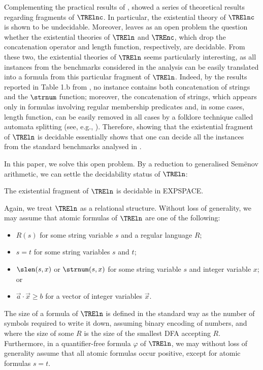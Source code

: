 Complementing the practical results of \cite{BKMMDNG20}, \cite{BDGKMMN23} showed a series of theoretical results regarding fragments of $\TRElnc$. In particular, the existential theory of $\TRElnc$ is shown to be undecidable. Moreover, \cite{BDGKMMN23} leaves as an open problem the question whether the existential theories of $\TREln$ and $\TREnc$, which drop the concatenation operator and length function, respectively, are decidable. From these two, the existential theories of $\TREln$ seems particularly interesting, as all instances from the benchmarks considered in the analysis \cite{BDGKMMN23} can be easily translated into a formula from this particular fragment of $\TREln$. Indeed, by the results reported in Table 1.b from \cite{BDGKMMN23},  %
no instance contains both concatenation of strings and the $\strnum$ function; moreover, the concatenation of strings, which appears only in formulas involving regular membership predicates and, in some cases, length function, can be easily removed in all cases by a folklore technique called automata splitting (see, e.g., \cite{AACHRRS15}). Therefore, showing that the existential fragment of $\TREln$ is decidable essentially shows that one can decide all the instances from the standard benchmarks analysed in \cite{BDGKMMN23}.

In this paper, we solve this open problem. By a reduction to generalised Sem{\"e}nov arithmetic, we can settle the decidability status of $\TREln$:
%
\begin{theorem}
  The existential fragment of $\TREln$ is decidable in EXPSPACE.
\end{theorem}
%

Again, we treat $\TREln$ as a relational structure. Without loss of
generality, we may assume that atomic formulas of $\TREln$ are one of
the following:
%
\begin{itemize}
\item $R(s)$ for some string variable $s$ and a regular language $R$;
\item $s=t$ for some string variables $s$ and $t$;
\item $\slen(s,x)$ or $\strnum(s,x)$ for some string variable $s$ and
  integer variable $x$; or
\item $\vec a \cdot \vec x \ge b$ for a vector of integer variables
  $\vec x$.
\end{itemize}
%
The size of a formula of $\TREln$ is defined in the standard way as
the number of symbols required to write it down, assuming binary
encoding of numbers, and where the size of some $R$ is the size of the
smallest DFA accepting $R$. Furthermore, in a quantifier-free formula
$\varphi$ of $\TREln$, we may without loss of generality assume that
all atomic formulas occur positive, except for atomic formulas $s=t$.

